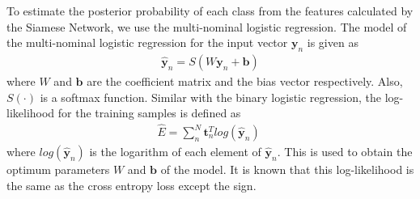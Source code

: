 \documentclass[twocolumn,10pt]{article}
\begin{document}
To estimate the posterior probability of each class from the features calculated by the Siamese Network, we use the multi-nominal logistic regression.
The model of the multi-nominal logistic regression for the input vector $\bm{y}_n$ is given as
\begin{align} \label{eq:regression multi}
    \hat{\bm y}_n = S(W\bm{y}_n+\bm{b})
\end{align}
where $W$ and $\bm{b}$ are the coefficient matrix and the bias vector respectively.
Also, $S(\cdot)$ is a softmax function.
Similar with the binary logistic regression, the log-likelihood for the training samples is defined as
\begin{align} \label{eq:multi crossentropy}
\hat{E} = \sum_n^N {\bm t}_n^Tlog(\hat{\bm y}_n) \; 
\end{align}
where $log(\hat{\bm y}_n)$ is the logarithm of each element of $\hat{\bm y}_n$. 
This is used to obtain the optimum parameters $W$ and $\bm{b}$ of the model.
It is known that this log-likelihood is the same as the cross entropy loss except the sign.
\end{document}
